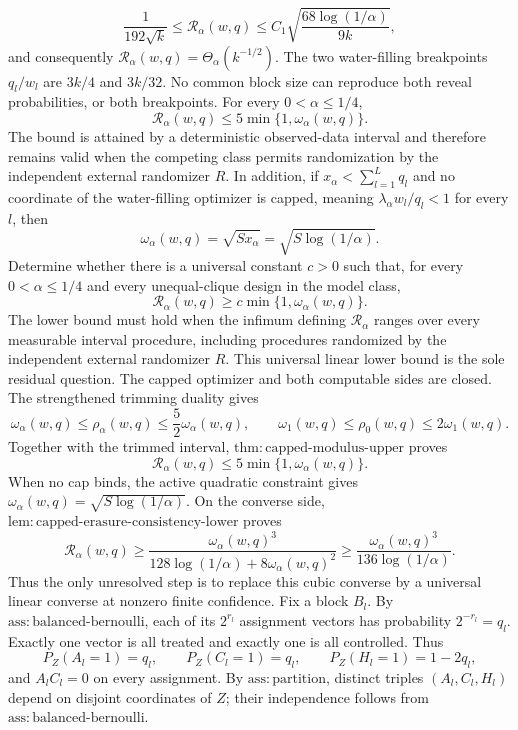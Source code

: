 \[
 \frac{1}{192\sqrt{k}}
 \le \mathcal R_\alpha(w,q)
 \le C_1\sqrt{\frac{68\log(1/\alpha)}{9k}},
\]
and consequently \(\mathcal R_\alpha(w,q)=\Theta_\alpha(k^{-1/2})\). The two water-filling breakpoints \(q_l/w_l\) are \(3k/4\) and \(3k/32\). No common block size can reproduce both reveal probabilities, or both breakpoints.
For every \(0<\alpha\le1/4\),
\[
 \mathcal R_\alpha(w,q)\le5\min\{1,\omega_\alpha(w,q)\}.
\]
The bound is attained by a deterministic observed-data interval and therefore remains valid when the competing class permits randomization by the independent external randomizer \(R\). In addition, if \(x_\alpha<\sum_{l=1}^Lq_l\) and no coordinate of the water-filling optimizer is capped, meaning \(\lambda_\alpha w_l/q_l<1\) for every \(l\), then
\[
 \omega_\alpha(w,q)=\sqrt{Sx_\alpha}=\sqrt{S\log(1/\alpha)}.
\]
Determine whether there is a universal constant \(c>0\) such that, for every \(0<\alpha\le1/4\) and every unequal-clique design in the model class,
\[
 \mathcal R_\alpha(w,q)\ge c\min\{1,\omega_\alpha(w,q)\}.
\]
The lower bound must hold when the infimum defining \(\mathcal R_\alpha\) ranges over every measurable interval procedure, including procedures randomized by the independent external randomizer \(R\). This universal linear lower bound is the sole residual question.
The capped optimizer and both computable sides are closed. The strengthened trimming duality gives
\[
 \omega_\alpha(w,q)\le\rho_\alpha(w,q)\le\frac52\omega_\alpha(w,q),
 \qquad
 \omega_1(w,q)\le\rho_0(w,q)\le2\omega_1(w,q).
\]
Together with the trimmed interval, \(\mathrm{thm{:}capped\text{-}modulus\text{-}upper}\) proves
\[
 \mathcal R_\alpha(w,q)\le5\min\{1,\omega_\alpha(w,q)\}.
\]
When no cap binds, the active quadratic constraint gives \(\omega_\alpha(w,q)=\sqrt{S\log(1/\alpha)}\). On the converse side, \(\mathrm{lem{:}capped\text{-}erasure\text{-}consistency\text{-}lower}\) proves
\[
 \mathcal R_\alpha(w,q)
 \ge\frac{\omega_\alpha(w,q)^3}{128\log(1/\alpha)+8\omega_\alpha(w,q)^2}
 \ge\frac{\omega_\alpha(w,q)^3}{136\log(1/\alpha)}.
\]
Thus the only unresolved step is to replace this cubic converse by a universal linear converse at nonzero finite confidence.
Fix a block \(B_l\). By \(\mathrm{ass{:}balanced\text{-}bernoulli}\), each of its \(2^{r_l}\) assignment vectors has probability \(2^{-r_l}=q_l\). Exactly one vector is all treated and exactly one is all controlled. Thus
\[
 P_Z(A_l=1)=q_l,\qquad P_Z(C_l=1)=q_l,
 \qquad P_Z(H_l=1)=1-2q_l,
\tag{1}
\]
and \(A_lC_l=0\) on every assignment. By \(\mathrm{ass{:}partition}\), distinct triples \((A_l,C_l,H_l)\) depend on disjoint coordinates of \(Z\); their independence follows from \(\mathrm{ass{:}balanced\text{-}bernoulli}\).

